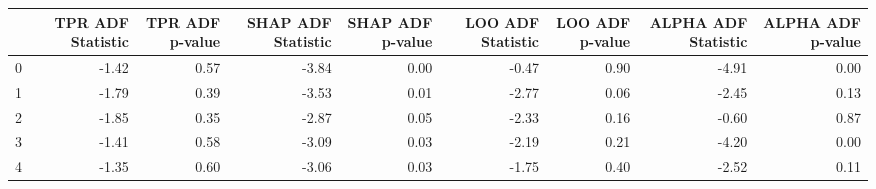 \begin{tabular}{lrrrrrrrr}
\toprule
 & TPR ADF Statistic & TPR ADF p-value & SHAP ADF Statistic & SHAP ADF p-value & LOO ADF Statistic & LOO ADF p-value & ALPHA ADF Statistic & ALPHA ADF p-value \\
\midrule
0 & -1.42 & 0.57 & -3.84 & 0.00 & -0.47 & 0.90 & -4.91 & 0.00 \\
1 & -1.79 & 0.39 & -3.53 & 0.01 & -2.77 & 0.06 & -2.45 & 0.13 \\
2 & -1.85 & 0.35 & -2.87 & 0.05 & -2.33 & 0.16 & -0.60 & 0.87 \\
3 & -1.41 & 0.58 & -3.09 & 0.03 & -2.19 & 0.21 & -4.20 & 0.00 \\
4 & -1.35 & 0.60 & -3.06 & 0.03 & -1.75 & 0.40 & -2.52 & 0.11 \\
\bottomrule
\end{tabular}
